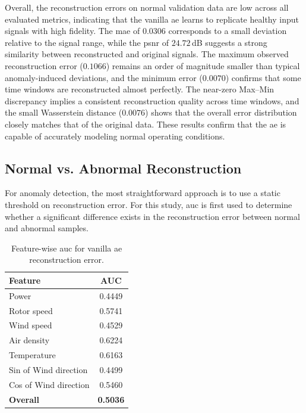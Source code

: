 Overall, the reconstruction errors on normal validation data are low across all evaluated metrics, indicating that the vanilla \gls{ae} learns to replicate healthy input signals with high fidelity.
The \gls{mae} of $0.0306$ corresponds to a small deviation relative to the signal range, while the \gls{psnr} of $24.72$\,dB suggests a strong similarity between reconstructed and original signals.
The maximum observed reconstruction error ($0.1066$) remains an order of magnitude smaller than typical anomaly-induced deviations, and the minimum error ($0.0070$) confirms that some time windows are reconstructed almost perfectly.
The near-zero Max--Min discrepancy implies a consistent reconstruction quality across time windows, and the small Wasserstein distance ($0.0076$) shows that the overall error distribution closely matches that of the original data.
These results confirm that the \gls{ae} is capable of accurately modeling normal operating conditions.



\subsection{Normal vs. Abnormal Reconstruction}
For anomaly detection, the most straightforward approach is to use a static threshold on reconstruction error.
For this study, \gls{auc} is first used to determine whether a significant difference exists in the reconstruction error between normal and abnormal samples.

\begin{table}[h!]
\centering
\caption{Feature-wise \gls{auc} for vanilla \gls{ae} reconstruction error.}
\label{tab:vanilla_feat_auc}
\begin{tabular}{lc}
    \toprule
    \textbf{Feature} & \textbf{AUC} \\
    \midrule
    Power & 0.4449 \\
    Rotor speed & 0.5741 \\
    Wind speed & 0.4529 \\
    Air density & 0.6224 \\
    Temperature & 0.6163 \\
    Sin of Wind direction & 0.4499 \\
    Cos of Wind direction & 0.5460 \\
    \midrule
    \textbf{Overall} & \textbf{0.5036} \\
    \bottomrule
\end{tabular}
\end{table}

